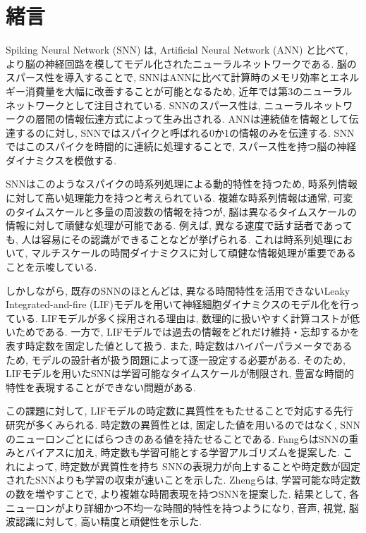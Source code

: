 \section{緒言}
Spiking Neural Network (SNN) は, Artificial Neural Network (ANN) と比べて, より脳の神経回路を模してモデル化されたニューラルネットワークである\cite{TAVANAEI201947}.
脳のスパース性を導入することで, SNNはANNに比べて計算時のメモリ効率とエネルギー消費量を大幅に改善することが可能となるため, 近年では第3のニューラルネットワークとして注目されている\cite{Henkes2024}.
SNNのスパース性は, ニューラルネットワークの層間の情報伝達方式によって生み出される.
ANNは連続値を情報として伝達するのに対し, SNNではスパイクと呼ばれる0か1の情報のみを伝達する.
SNNではこのスパイクを時間的に連続に処理することで, スパース性を持つ脳の神経ダイナミクスを模倣する.

SNNはこのようなスパイクの時系列処理による動的特性を持つため, 時系列情報に対して高い処理能力を持つと考えられている\cite{zheng2024temporal}.
複雑な時系列情報は通常, 可変のタイムスケールと多量の周波数の情報を持つが, 脳は異なるタイムスケールの情報に対して頑健な処理が可能である\cite{10.1162/jocn_a_01615}.
例えば, 異なる速度で話す話者であっても, 人は容易にその認識ができることなどが挙げられる.
これは時系列処理において, マルチスケールの時間ダイナミクスに対して頑健な情報処理が重要であることを示唆している.

しかしながら, 既存のSNNのほとんどは, 異なる時間特性を活用できないLeaky Integrated-and-fire (LIF)モデルを用いて神経細胞ダイナミクスのモデル化を行っている\cite{dayan2003theoretical}.
LIFモデルが多く採用される理由は, 数理的に扱いやすく計算コストが低いためである.
一方で, LIFモデルでは過去の情報をどれだけ維持・忘却するかを表す時定数を固定した値として扱う.
また, 時定数はハイパーパラメータであるため, モデルの設計者が扱う問題によって逐一設定する必要がある.
そのため, LIFモデルを用いたSNNは学習可能なタイムスケールが制限され, 豊富な時間的特性を表現することができない問題がある.

この課題に対して, LIFモデルの時定数に異質性をもたせることで対応する先行研究が多くみられる\cite{10.1145/3407197.3407225}\cite{ParametricSNN}.
時定数の異質性とは, 固定した値を用いるのではなく, SNNのニューロンごとにばらつきのある値を持たせることである.
Fangら\cite{ParametricSNN}はSNNの重みとバイアスに加え, 時定数も学習可能とする学習アルゴリズムを提案した.
これによって, 時定数が異質性を持ち SNNの表現力が向上することや時定数が固定されたSNNよりも学習の収束が速いことを示した.
Zhengら\cite{zheng2024temporal}は, 学習可能な時定数の数を増やすことで, より複雑な時間表現を持つSNNを提案した.
結果として, 各ニューロンがより詳細かつ不均一な時間的特性を持つようになり, 音声, 視覚, 脳波認識に対して, 高い精度と頑健性を示した.

